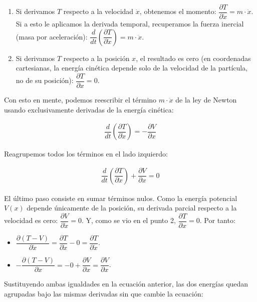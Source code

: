 \documentclass[
  spanish,
]{article}
\providecommand{\tightlist}{%
  \setlength{\itemsep}{0pt}\setlength{\parskip}{0pt}}
\begin{document}
\begin{enumerate}
\def\labelenumi{\arabic{enumi}.}
\tightlist
\item
  Si derivamos \(T\) respecto a la velocidad \(\dot{x}\), obtenemos el
  momento: \(\dfrac{\partial T}{\partial \dot{x}} = m \cdot \dot{x}\).
  Si a esto le aplicamos la derivada temporal, recuperamos la fuerza
  inercial (masa por aceleración):
  \(\dfrac{d}{dt}\left( \dfrac{\partial T}{\partial \dot{x}} \right) = m \cdot \ddot{x}\).
\item
  Si derivamos \(T\) respecto a la posición \(x\), el resultado es cero
  (en coordenadas cartesianas, la energía cinética depende solo de la
  velocidad de la partícula, no de su posición):
  \(\dfrac{\partial T}{\partial x} = 0\).
\end{enumerate}

Con esto en mente, podemos reescribir el término \(m \cdot \ddot{x}\) de
la ley de Newton usando exclusivamente derivadas de la energía cinética:

\[
\begin{aligned}
\dfrac{d}{dt}\left( \dfrac{\partial T}{\partial \dot{x}} \right) = -\dfrac{\partial V}{\partial x}
\end{aligned}
\]

Reagrupemos todos los términos en el lado izquierdo:

\[
\begin{aligned}
\dfrac{d}{dt}\left( \dfrac{\partial T}{\partial \dot{x}} \right) + \dfrac{\partial V}{\partial x} = 0
\end{aligned}
\]

El último paso consiste en sumar términos nulos. Como la energía
potencial \(V(x)\) depende únicamente de la posición, su derivada
parcial respecto a la velocidad es cero:
\(\dfrac{\partial V}{\partial \dot{x}} = 0\). Y, como se vio en el punto
2, \(\dfrac{\partial T}{\partial x} = 0\). Por tanto:

\begin{itemize}
\tightlist
\item
  \(\dfrac{\partial (T - V)}{\partial \dot{x}} = \dfrac{\partial T}{\partial \dot{x}} - 0 = \dfrac{\partial T}{\partial \dot{x}}\).
\item
  \(-\dfrac{\partial (T - V)}{\partial x} = -0 + \dfrac{\partial V}{\partial x} = \dfrac{\partial V}{\partial x}\).
\end{itemize}

Sustituyendo ambas igualdades en la ecuación anterior, las dos energías
quedan agrupadas bajo las mismas derivadas sin que cambie la ecuación:
\end{document}
